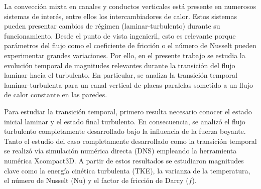 \begin{resumen}
%

La convección mixta en canales y conductos verticales está presente en numerosos sistemas de interés, entre ellos los intercambiadores de calor. Estos sistemas pueden presentar cambios de régimen (laminar-turbulento) durante su funcionamiento. Desde el punto de vista ingenieril, esto es relevante porque parámetros del flujo como el coeficiente de fricción o el número de Nusselt pueden experimentar grandes variaciones. Por ello, en el presente trabajo se estudia la evolución temporal de magnitudes relevantes durante la transición del flujo laminar hacia el turbulento. En particular, se analiza la transición temporal laminar-turbulenta para un canal vertical de placas paralelas sometido a un flujo de calor constante en las paredes.

Para estudiar la transición temporal, primero resulta necesario conocer el estado inicial laminar y el estado final turbulento. En consecuencia, se analizó el flujo turbulento completamente desarrollado bajo la influencia de la fuerza boyante. Tanto el estudio del caso completamente desarrollado como la transición temporal se realizó vía simulación numérica directa (DNS) empleando la herramienta numérica Xcompact3D. A partir de estos resultados se estudiaron magnitudes clave como la energía cinética turbulenta (TKE), la varianza de la temperatura, el número de Nusselt (Nu) y el factor de fricción de Darcy ($f$).


\end{resumen}
